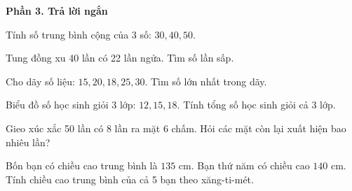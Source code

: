 \textbf{Phần 3. Trả lời ngắn}

\begin{ex} %
Tính số trung bình cộng của 3 số: $30, 40, 50$.
\end{ex}

\begin{ex} %
Tung đồng xu 40 lần có 22 lần ngửa. Tìm số lần sấp.
\end{ex}

\begin{ex} %
Cho dãy số liệu: $15, 20, 18, 25, 30$. Tìm số lớn nhất trong dãy.
\end{ex}

\begin{ex} %
Biểu đồ số học sinh giỏi 3 lớp: $12, 15, 18$. Tính tổng số học sinh giỏi cả 3 lớp.
\end{ex}

\begin{ex} %
Gieo xúc xắc 50 lần có 8 lần ra mặt 6 chấm. Hỏi các mặt còn lại xuất hiện bao nhiêu lần?
\end{ex}

\begin{ex} %
Bốn bạn có chiều cao trung bình là $135\text{ cm}$. Bạn thứ năm có chiều cao $140\text{ cm}$. Tính chiều cao trung bình của cả 5 bạn theo xăng-ti-mét.
\end{ex}
